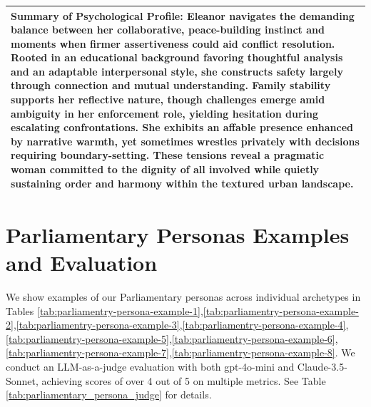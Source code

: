 \documentclass[11pt]{article}
\begin{document}
\begin{table}[ht]
\begin{tabularx}{\textwidth}{X}
\textbf{Summary of Psychological Profile:} Eleanor navigates the demanding balance between her collaborative, peace-building instinct and moments when firmer assertiveness could aid conflict resolution. Rooted in an educational background favoring thoughtful analysis and an adaptable interpersonal style, she constructs safety largely through connection and mutual understanding. Family stability supports her reflective nature, though challenges emerge amid ambiguity in her enforcement role, yielding hesitation during escalating confrontations. She exhibits an affable presence enhanced by narrative warmth, yet sometimes wrestles privately with decisions requiring boundary-setting. These tensions reveal a pragmatic woman committed to the dignity of all involved while quietly sustaining order and harmony within the textured urban landscape. \\

\bottomrule
\end{tabularx}
\end{table}

\section{Parliamentary Personas Examples and Evaluation}\label{app:parliamentary_examples}

We show examples of our Parliamentary personas across individual archetypes in Tables \ref{tab:parliamentry-persona-example-1},\ref{tab:parliamentry-persona-example-2},\ref{tab:parliamentry-persona-example-3},\ref{tab:parliamentry-persona-example-4},\ref{tab:parliamentry-persona-example-5},\ref{tab:parliamentry-persona-example-6},\ref{tab:parliamentry-persona-example-7},\ref{tab:parliamentry-persona-example-8}. We conduct an LLM-as-a-judge evaluation with both gpt-4o-mini and Claude-3.5-Sonnet, achieving scores of over 4 out of 5 on multiple metrics. See Table \ref{tab:parliamentary_persona_judge} for details.
\end{document}
